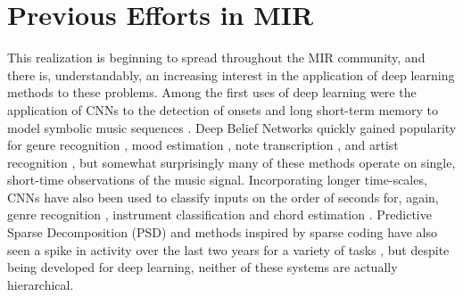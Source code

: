 \section{Previous Efforts in MIR}

This realization is beginning to spread throughout the MIR community, and there is, understandably, an increasing interest in the application of deep learning methods to these problems.
Among the first uses of deep learning were the application of CNNs to the detection of onsets \cite{Lacoste2007} and long short-term memory to model symbolic music sequences \cite{Eck2008}.
Deep Belief Networks quickly gained popularity for genre recognition \cite{Hamel2009}, mood estimation \cite{Schmidt2011}, note transcription \cite{Nam2011}, and artist recognition \cite{Dieleman2011}, but somewhat surprisingly many of these methods operate on single, short-time observations of the music signal.
Incorporating longer time-scales, CNNs have also been used to classify inputs on the order of seconds for, again, genre recognition \cite{Li2010}, instrument classification \cite{Humphrey2010} and chord estimation \cite{Humphrey2011, Humphrey2012b}.
Predictive Sparse Decomposition (PSD) and methods inspired by sparse coding have also seen a spike in activity over the last two years for a variety of tasks \cite{Henaff2011, Nam2012}, but despite being developed for deep learning, neither of these systems are actually hierarchical.

